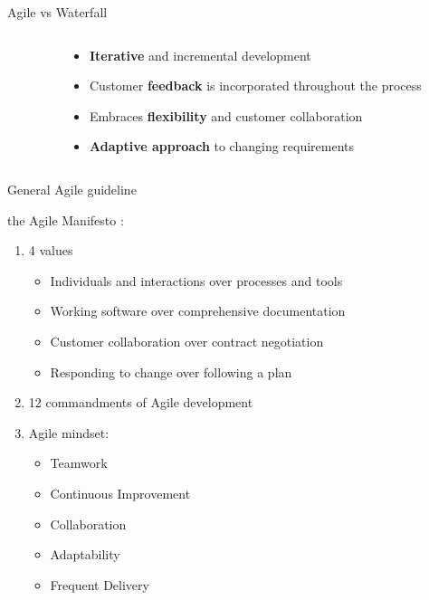 \documentclass[10pt]{beamer}
\begin{document}
\begin{frame}{Agile vs Waterfall}
  \vspace{2cm}
  \begin{columns}[T]

    \begin{column}{0.5\textwidth}
    \end{column}

    \begin{column}{0.5\textwidth}
      \begin{itemize}
        \item<2-> \textbf{Iterative} and incremental development 
        \item<3-> Customer \textbf{feedback} is incorporated throughout the process
        \item<4-> Embraces \textbf{flexibility} and customer collaboration
        \item<5-> \textbf{Adaptive approach }to changing requirements
      \end{itemize}
    \end{column}

  \end{columns}
\end{frame}

\begin{frame}{General Agile guideline}


    the Agile Manifesto : \\
    \begin{enumerate}
    \item 4 values
    \begin{itemize}
      \item<2-> Individuals and interactions over processes and tools 
      \item<3-> Working software over comprehensive documentation
      \item<4-> Customer collaboration over contract negotiation 
      \item<5-> Responding to change over following a plan
    \end{itemize}
    \item 12 commandments of Agile development \\
    \item Agile mindset: 
    \begin{itemize}
      \item<6-> Teamwork
      \item<7-> Continuous Improvement
      \item<8-> Collaboration
      \item<9-> Adaptability
      \item<10-> Frequent Delivery
    \end{itemize}
    \end{enumerate}

\end{frame}
\end{document}
